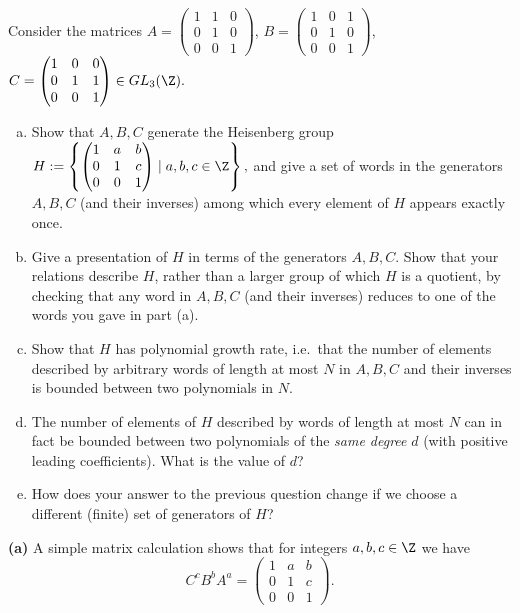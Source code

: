 \documentclass[11pt,letterpaper]{article}
\begin{document}
\pagebreak
\begin{problem}
Consider the matrices
$A=\begin{pmatrix} 1&1&0 \\ 0&1&0\\ 0&0&1\end{pmatrix}$, 
$B=\begin{pmatrix} 1&0&1 \\ 0&1&0\\ 0&0&1\end{pmatrix}$,
$C=\begin{pmatrix} 1&0&0 \\ 0&1&1\\ 0&0&1\end{pmatrix}\in GL_3(\Z).$   
    \begin{enumerate}[(a)]
       \item Show that $A,B,C$ generate the Heisenberg group $H :=  \left\{ 
\begin{pmatrix}
1 & a & b \\
0 & 1 & c \\
0 & 0 & 1
\end{pmatrix}
\mid a, b, c \in \Z \right\},
$
and give a set of words in the generators $A,B,C$ (and their inverses) among which every element
of $H$ appears exactly once. 
        \item Give a presentation of $H$ in terms of the generators $A,B,C$.
Show that your relations describe $H$, rather than a larger group of
which $H$ is a quotient, by checking that any word in $A,B,C$ (and their 
inverses) reduces to one of the words you gave in part (a).
        \item Show that $H$ has polynomial growth rate, i.e.\ that the number of 
elements described by arbitrary words of length at most $N$ in $A,B,C$
and their inverses is bounded between two polynomials in $N$.
        \item The number of elements of $H$ described by words of length at most $N$
can in fact be bounded
between two polynomials of the {\em same degree} $d$ (with positive leading
coefficients). What is the value of $d$?
        \item How does your answer to the previous question change if we choose a 
different (finite) set of generators of $H$?
    \end{enumerate}
\end{problem}

\textbf{(a)} A simple matrix calculation shows that for integers $a,b,c\in \Z$ we have
\[
    C^c B^b A^a = \begin{pmatrix}
        1 & a & b\\ 0 & 1 & c \\ 0 & 0 & 1
    \end{pmatrix}
.\] 
\end{document}
